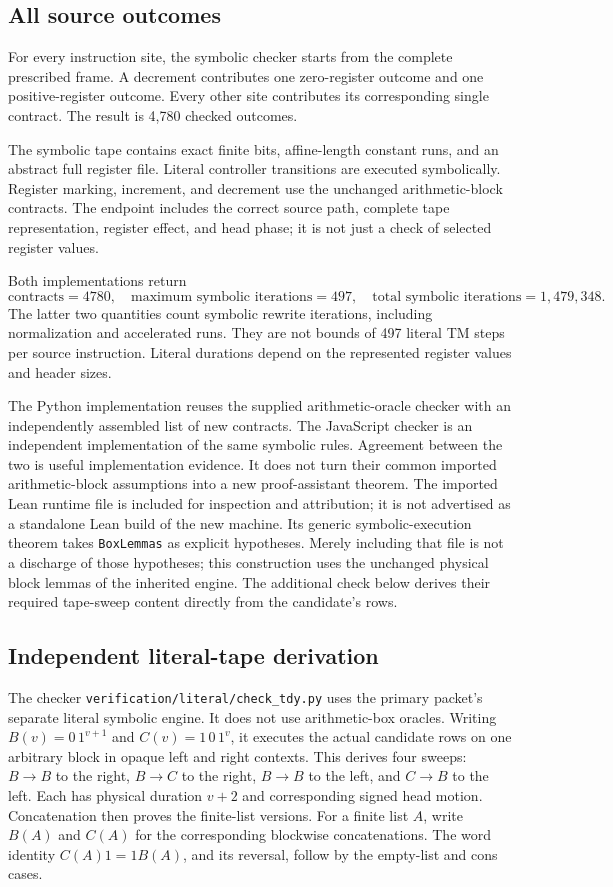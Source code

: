 \documentclass[11pt]{article}
\newcommand{\file}[1]{\nolinkurl{#1}}
\begin{document}
\subsection{All source outcomes}
For every instruction site, the symbolic checker starts from the complete
prescribed frame. A decrement contributes one zero-register outcome and one
positive-register outcome. Every other site contributes its corresponding
single contract. The result is 4,780 checked outcomes.

The symbolic tape contains exact finite bits, affine-length constant runs,
and an abstract full register file. Literal controller transitions are
executed symbolically. Register marking, increment, and decrement use the
unchanged arithmetic-block contracts. The endpoint includes the correct
source path, complete tape representation, register effect, and head phase;
it is not just a check of selected register values.

Both implementations return
\[
 \text{contracts}=4780,\quad
 \text{maximum symbolic iterations}=497,\quad
 \text{total symbolic iterations}=1{,}479{,}348.
\]
The latter two quantities count symbolic rewrite iterations, including
normalization and accelerated runs. They are not bounds of 497 literal TM
steps per source instruction. Literal durations depend on the represented
register values and header sizes.

The Python implementation reuses the supplied arithmetic-oracle checker with
an independently assembled list of new contracts. The JavaScript checker is
an independent implementation of the same symbolic rules. Agreement between
the two is useful implementation evidence. It does not turn their common
imported arithmetic-block assumptions into a new proof-assistant theorem.
The imported Lean runtime file is included for inspection and attribution;
it is not advertised as a standalone Lean build of the new machine.
Its generic symbolic-execution theorem takes \texttt{BoxLemmas} as explicit
hypotheses. Merely including that file is not a discharge of those hypotheses;
this construction uses the unchanged physical block lemmas of the inherited
engine. The additional check below derives their required tape-sweep content
directly from the candidate's rows.

\subsection{Independent literal-tape derivation}
The checker \file{verification/literal/check_tdy.py} uses the primary packet's
separate literal symbolic engine. It does not use arithmetic-box oracles.
Writing $B(v)=0\,1^{v+1}$ and $C(v)=1\,0\,1^v$, it executes the actual
candidate rows on one arbitrary block in opaque left and right contexts.
This derives four sweeps: $B\to B$ to the right, $B\to C$ to the right,
$B\to B$ to the left, and $C\to B$ to the left. Each has physical duration
$v+2$ and corresponding signed head motion. Concatenation then proves the
finite-list versions. For a finite list $A$, write $B(A)$ and $C(A)$ for
the corresponding blockwise concatenations. The word identity
$C(A)1=1B(A)$, and its reversal,
follow by the empty-list and cons cases.
\end{document}
